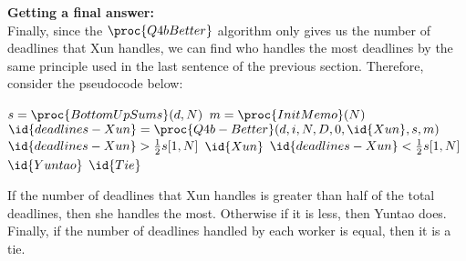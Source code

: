 
\textbf{Getting a final answer:}\\
Finally, since the $\proc{Q4bBetter}$ algorithm only gives us the number of deadlines that Xun handles, we can find who handles the most deadlines by the same principle used in the last sentence of the previous section.
Therefore, consider the pseudocode below:

\begin{spacing}{1.2}
    \begin{codebox}
        \li $s = \proc{BottomUpSums}(d, N)$
        \li $m = \proc{InitMemo}(N)$
        \li $\id{deadlines-Xun} = \proc{Q4b-Better}(d, i, N, D, 0, \id{Xun}, s, m)$
        \li \If $\id{deadlines-Xun} > {1 \over 2}s[1, N]$
        \Then
        \li \Return $\id{Xun}$
        \li \ElseIf $\id{deadlines-Xun} < {1 \over 2}s[1, N]$
        \Then
        \li \Return $\id{Yuntao}$
        \li \Else
        \li \Return $\id{Tie}$
        \End
    \end{codebox}
\end{spacing}
\vspace{5mm}
If the number of deadlines that Xun handles is greater than half of the total deadlines, then she handles the most.
Otherwise if it is less, then Yuntao does.
Finally, if the number of deadlines handled by each worker is equal, then it is a tie.\\


